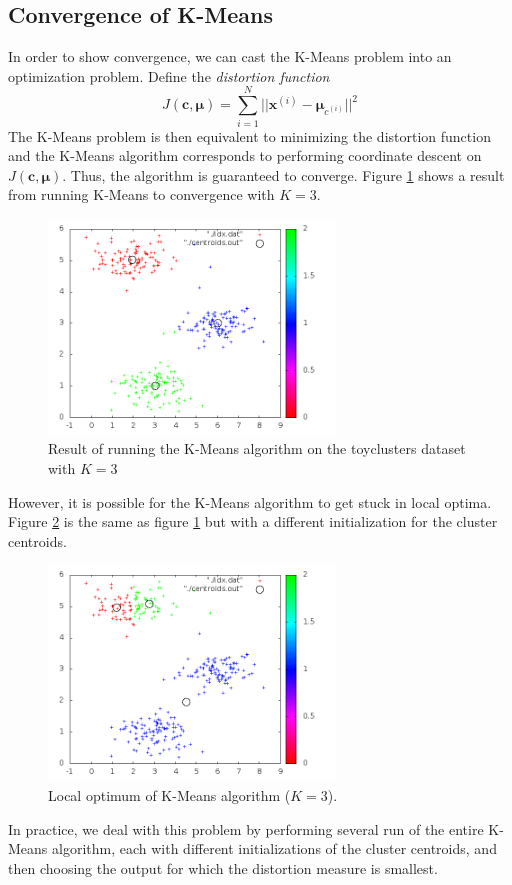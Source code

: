 \documentclass[final,3p,times,twocolumn]{elsarticle}
\begin{document}
\subsection{Convergence of K-Means}

In order to show convergence, we can cast the K-Means problem into an optimization problem. Define the \emph{distortion function} 
\begin{equation}
J(\boldsymbol c, \boldsymbol \mu) = \sum_{i=1}^N ||\boldsymbol x^{(i)} - \boldsymbol \mu_{c^{(i)}}||^2
\label{eqn:distortion}
\end{equation}
The K-Means problem is then equivalent to minimizing the distortion function and the K-Means algorithm corresponds to performing coordinate descent on $J(\boldsymbol c, \boldsymbol \mu)$.
Thus, the algorithm is guaranteed to converge. 
Figure \ref{fig:kmeans1} shows a result from running K-Means to convergence with $K = 3$.
\begin{figure}
\centering
\includegraphics[width=3in]{kmeans1.png}
\caption{Result of running the K-Means algorithm on the toyclusters dataset with $K=3$}
\label{fig:kmeans1}
\end{figure}

However, it is possible for the K-Means algorithm to get stuck in local optima.
Figure \ref{fig:kmeans2} is the same as figure \ref{fig:kmeans1} but with a different initialization for the cluster centroids. 
\begin{figure}
\centering
\includegraphics[width=3in]{kmeans2.png}
\caption{Local optimum of K-Means algorithm ($K=3$).}
\label{fig:kmeans2}
\end{figure}
In practice, we deal with this problem by performing several run of the entire K-Means algorithm, each with different initializations of the cluster centroids, and then choosing the output for which the distortion measure is smallest.
\end{document}
